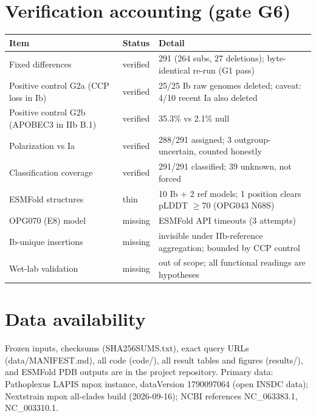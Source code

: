 \documentclass[11pt]{article}
\begin{document}
\section{Verification accounting (gate G6)}
\begin{tabular}{lll}
\hline
Item & Status & Detail \\
\hline
Fixed differences & verified & 291 (264 subs, 27 deletions); byte-identical re-run (G1 pass) \\
Positive control G2a (CCP loss in Ib) & verified & 25/25 Ib raw genomes deleted; caveat: 4/10 recent Ia also deleted \\
Positive control G2b (APOBEC3 in IIb B.1) & verified & 35.3\% vs 2.1\% null \\
Polarization vs Ia & verified & 288/291 assigned; 3 outgroup-uncertain, counted honestly \\
Classification coverage & verified & 291/291 classified; 39 unknown, not forced \\
ESMFold structures & thin & 10 Ib + 2 ref models; 1 position clears pLDDT $\geq$70 (OPG043 N68S) \\
OPG070 (E8) model & missing & ESMFold API timeouts (3 attempts) \\
Ib-unique insertions & missing & invisible under IIb-reference aggregation; bounded by CCP control \\
Wet-lab validation & missing & out of scope; all functional readings are hypotheses \\
\hline
\end{tabular}

\section{Data availability}
Frozen inputs, checksums (SHA256SUMS.txt), exact query URLs (data/MANIFEST.md), all code
(code/), all result tables and figures (results/), and ESMFold PDB outputs are in the project
repository. Primary data: Pathoplexus LAPIS mpox instance, dataVersion 1790097064 (open INSDC
data); Nextstrain mpox all-clades build (2026-09-16); NCBI references NC\_063383.1, NC\_003310.1.
\end{document}
